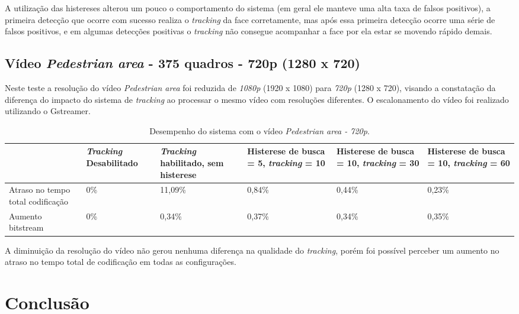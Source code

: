 \documentclass[12pt]{article}
\begin{document}
A utilização das histereses alterou um pouco o comportamento do sistema (em geral ele manteve uma alta taxa de falsos positivos), a primeira detecção que ocorre com sucesso realiza o \textit{tracking} da face corretamente, mas após essa primeira detecção ocorre uma série de falsos positivos, e em algumas detecções positivas o \textit{tracking} não consegue acompanhar a face por ela estar se movendo rápido demais.


\subsection{ Vídeo \textit{Pedestrian area} - 375 quadros - 720p (1280 x 720) }


Neste teste a resolução do vídeo \textit{Pedestrian area} foi reduzida de \textit{1080p} (1920 x 1080) para \textit{720p} (1280 x 720), visando a constatação da diferença do impacto do sistema de \textit{tracking} ao processar o mesmo vídeo com resoluções diferentes. O escalonamento do vídeo foi realizado utilizando o Gstreamer.


\begin{table}[H]
\begin{center}
\begin{tabular}{|p{2.3cm}|p{2.3cm}|p{2.3cm}|p{2.3cm}|p{2.3cm}|p{2.3cm}|}
\hline
\textbf{} & \textbf{\textit{Tracking} Desabilitado} & \textbf{\textit{Tracking} habilitado, sem histerese} & \textbf{Histerese de busca = 5, \textit{tracking} = 10} & \textbf{Histerese de busca = 10, \textit{tracking} = 30} & \textbf{Histerese de busca = 10, \textit{tracking} = 60} \\
\hline
Atraso no tempo total codificação & 0\% & 11,09\% & 0,84\% & 0,44\% & 0,23\% \\
\hline
Aumento bitstream  & 0\% & 0,34\% & 0,37\% & 0,34\% & 0,35\% \\
\hline
\end{tabular}
\caption{Desempenho do sistema com o vídeo \textit{Pedestrian area - 720p}.}
\label{tab:space_overhead}
\end{center}
\end{table}

A diminuição da resolução do vídeo não gerou nenhuma diferença na qualidade do \textit{tracking}, porém foi possível perceber um aumento no atraso no tempo total de codificação em todas as configurações. 

\section*{Conclusão}
\label{art:conclusao}
\end{document}
